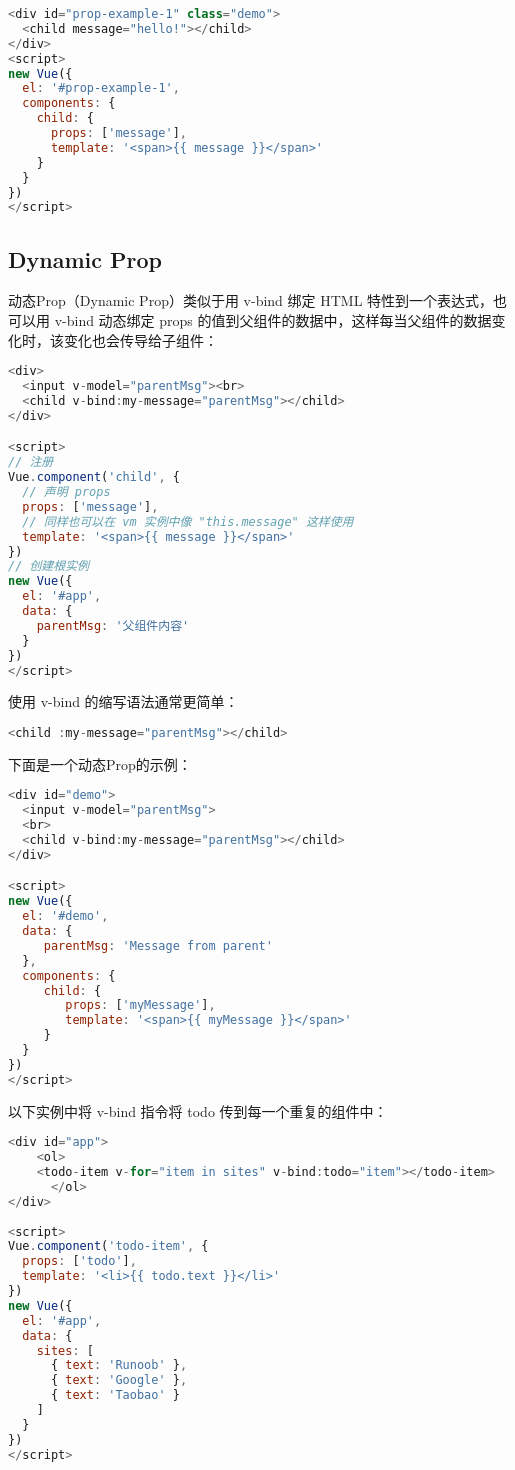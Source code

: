 \begin{lstlisting}[language=JavaScript]
<div id="prop-example-1" class="demo">
  <child message="hello!"></child>
</div>
<script>
new Vue({
  el: '#prop-example-1',
  components: {
    child: {
      props: ['message'],
      template: '<span>{{ message }}</span>'
    }
  }
})
</script>
\end{lstlisting}


\subsection{Dynamic Prop}



动态Prop（Dynamic Prop）类似于用 v-bind 绑定 HTML 特性到一个表达式，也可以用 v-bind 动态绑定 props 的值到父组件的数据中，这样每当父组件的数据变化时，该变化也会传导给子组件：

\begin{lstlisting}[language=JavaScript]
<div>
  <input v-model="parentMsg"><br>
  <child v-bind:my-message="parentMsg"></child>
</div>

<script>
// 注册
Vue.component('child', {
  // 声明 props
  props: ['message'],
  // 同样也可以在 vm 实例中像 "this.message" 这样使用
  template: '<span>{{ message }}</span>'
})
// 创建根实例
new Vue({
  el: '#app',
  data: {
    parentMsg: '父组件内容'
  }
})
</script>
\end{lstlisting}

使用 v-bind 的缩写语法通常更简单：

\begin{lstlisting}[language=JavaScript]
<child :my-message="parentMsg"></child>
\end{lstlisting}

下面是一个动态Prop的示例：

\begin{lstlisting}[language=JavaScript]
<div id="demo">
  <input v-model="parentMsg">
  <br>
  <child v-bind:my-message="parentMsg"></child>
</div>

<script>
new Vue({
  el: '#demo',
  data: {
     parentMsg: 'Message from parent'
  },
  components: {
     child: {
        props: ['myMessage'],
        template: '<span>{{ myMessage }}</span>'
     }
  } 
})
</script>
\end{lstlisting}


以下实例中将 v-bind 指令将 todo 传到每一个重复的组件中：

\begin{lstlisting}[language=JavaScript]
<div id="app">
    <ol>
    <todo-item v-for="item in sites" v-bind:todo="item"></todo-item>
      </ol>
</div>
 
<script>
Vue.component('todo-item', {
  props: ['todo'],
  template: '<li>{{ todo.text }}</li>'
})
new Vue({
  el: '#app',
  data: {
    sites: [
      { text: 'Runoob' },
      { text: 'Google' },
      { text: 'Taobao' }
    ]
  }
})
</script>
\end{lstlisting}

